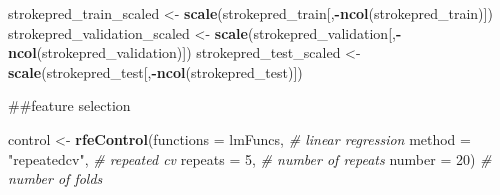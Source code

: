 \documentclass[
]{article}
\newenvironment{Shaded}{\begin{snugshade}}{\end{snugshade}}
\newcommand{\AttributeTok}[1]{\textcolor[rgb]{0.13,0.29,0.53}{#1}}
\newcommand{\CommentTok}[1]{\textcolor[rgb]{0.56,0.35,0.01}{\textit{#1}}}
\newcommand{\DecValTok}[1]{\textcolor[rgb]{0.00,0.00,0.81}{#1}}
\newcommand{\FunctionTok}[1]{\textcolor[rgb]{0.13,0.29,0.53}{\textbf{#1}}}
\newcommand{\NormalTok}[1]{#1}
\newcommand{\OtherTok}[1]{\textcolor[rgb]{0.56,0.35,0.01}{#1}}
\newcommand{\SpecialCharTok}[1]{\textcolor[rgb]{0.81,0.36,0.00}{\textbf{#1}}}
\newcommand{\StringTok}[1]{\textcolor[rgb]{0.31,0.60,0.02}{#1}}
\begin{document}
\begin{Shaded}
\begin{Highlighting}[]
\NormalTok{strokepred\_train\_scaled }\OtherTok{\textless{}{-}} \FunctionTok{scale}\NormalTok{(strokepred\_train[,}\SpecialCharTok{{-}}\FunctionTok{ncol}\NormalTok{(strokepred\_train)])}
\NormalTok{strokepred\_validation\_scaled }\OtherTok{\textless{}{-}} \FunctionTok{scale}\NormalTok{(strokepred\_validation[,}\SpecialCharTok{{-}}\FunctionTok{ncol}\NormalTok{(strokepred\_validation)])}
\NormalTok{strokepred\_test\_scaled }\OtherTok{\textless{}{-}} \FunctionTok{scale}\NormalTok{(strokepred\_test[,}\SpecialCharTok{{-}}\FunctionTok{ncol}\NormalTok{(strokepred\_test)])}
\end{Highlighting}
\end{Shaded}

\begin{Shaded}
\end{Shaded}

\#\#feature selection

\begin{Shaded}
\begin{Highlighting}[]
\NormalTok{control }\OtherTok{\textless{}{-}} \FunctionTok{rfeControl}\NormalTok{(}\AttributeTok{functions =}\NormalTok{ lmFuncs, }\CommentTok{\# linear regression}
                      \AttributeTok{method =} \StringTok{"repeatedcv"}\NormalTok{, }\CommentTok{\# repeated cv}
                      \AttributeTok{repeats =} \DecValTok{5}\NormalTok{, }\CommentTok{\# number of repeats}
                      \AttributeTok{number =} \DecValTok{20}\NormalTok{) }\CommentTok{\# number of folds}
\end{Highlighting}
\end{Shaded}
\end{document}
